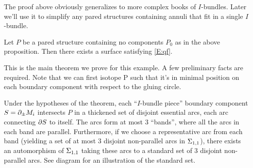 The proof above obviously generalizes to more complex books of $I$-bundles.
Later we'll use it to simplify any pared structures containing annuli that fit
in a single $I$-bundle.

\begin{thm}\label{T:ex1}

Let $P$ be a pared structure containing no components $P_0$ as in the above
proposition. Then there exists a surface satisfying \eqref{E:qf}.

\end{thm}

This is the main theorem we prove for this example. A few preliminary facts are
required. Note that we can first isotope P such that it's in minimal position
on each boundary component with respect to the gluing circle.

\begin{lemma}

Under the hypotheses of the theorem, each ``$I$-bundle piece'' boundary
component $S=\partial_\pm M_i$ intersects $P$ in a thickened set of disjoint
essential arcs, each arc connecting $\partial S$ to itself. The arcs form at most
3 ``bands'', where all the arcs in each band are parallel.  Furthermore, if we
choose a representative arc from each band (yielding a set of at most
3 disjoint non-parallel arcs in $\Sigma_{1,1}$), there exists an automorphism of
$\Sigma_{1,1}$ taking these arcs to a standard set of 3 disjoint non-parallel
arcs.  See diagram for an illustration of the standard set.

\end{lemma}
